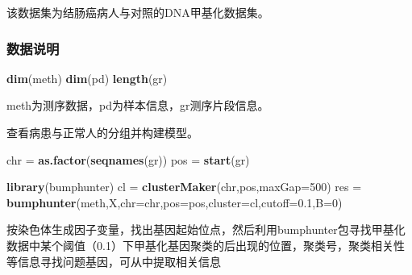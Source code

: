 \documentclass[
]{book}
\newenvironment{Shaded}{\begin{snugshade}}{\end{snugshade}}
\newcommand{\DataTypeTok}[1]{\textcolor[rgb]{0.13,0.29,0.53}{#1}}
\newcommand{\DecValTok}[1]{\textcolor[rgb]{0.00,0.00,0.81}{#1}}
\newcommand{\FloatTok}[1]{\textcolor[rgb]{0.00,0.00,0.81}{#1}}
\newcommand{\KeywordTok}[1]{\textcolor[rgb]{0.13,0.29,0.53}{\textbf{#1}}}
\newcommand{\NormalTok}[1]{#1}
\newcommand{\OperatorTok}[1]{\textcolor[rgb]{0.81,0.36,0.00}{\textbf{#1}}}
\newcommand{\StringTok}[1]{\textcolor[rgb]{0.31,0.60,0.02}{#1}}
\begin{document}
该数据集为结肠癌病人与对照的DNA甲基化数据集。

\hypertarget{ux6570ux636eux8bf4ux660e}{%
\subsubsection{数据说明}\label{ux6570ux636eux8bf4ux660e}}

\begin{Shaded}
\begin{Highlighting}[]
\KeywordTok{dim}\NormalTok{(meth)}
\KeywordTok{dim}\NormalTok{(pd)}
\KeywordTok{length}\NormalTok{(gr)}
\end{Highlighting}
\end{Shaded}

meth为测序数据，pd为样本信息，gr测序片段信息。

\begin{Shaded}
\end{Shaded}

查看病患与正常人的分组并构建模型。

\begin{Shaded}
\begin{Highlighting}[]
\NormalTok{chr =}\StringTok{ }\KeywordTok{as.factor}\NormalTok{(}\KeywordTok{seqnames}\NormalTok{(gr))}
\NormalTok{pos =}\StringTok{ }\KeywordTok{start}\NormalTok{(gr)}

\KeywordTok{library}\NormalTok{(bumphunter)}
\NormalTok{cl =}\StringTok{ }\KeywordTok{clusterMaker}\NormalTok{(chr,pos,}\DataTypeTok{maxGap=}\DecValTok{500}\NormalTok{)}
\NormalTok{res =}\StringTok{ }\KeywordTok{bumphunter}\NormalTok{(meth,X,}\DataTypeTok{chr=}\NormalTok{chr,}\DataTypeTok{pos=}\NormalTok{pos,}\DataTypeTok{cluster=}\NormalTok{cl,}\DataTypeTok{cutoff=}\FloatTok{0.1}\NormalTok{,}\DataTypeTok{B=}\DecValTok{0}\NormalTok{)}
\end{Highlighting}
\end{Shaded}

按染色体生成因子变量，找出基因起始位点，然后利用bumphunter包寻找甲基化数据中某个阈值（0.1）下甲基化基因聚类的后出现的位置，聚类号，聚类相关性等信息寻找问题基因，可从中提取相关信息
\end{document}
